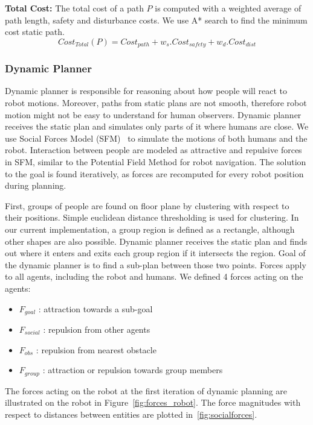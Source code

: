 \documentclass[12pt]{gatech-thesis}
\begin{document}
\textbf{Total Cost:} The total cost of a path $P$ is computed with a weighted average of path length, safety and disturbance costs. We use A* search to find the minimum cost static path.
\[
Cost_{Total}(P) = Cost_{path}+w_{s}.Cost_{safety} + w_d.Cost_{dist}
\]

\subsubsection{Dynamic Planner}
Dynamic planner is responsible for reasoning about how people will react to robot motions. Moreover, paths from static plans are not smooth, therefore robot motion might not be easy to understand for human observers. Dynamic planner receives the static plan and simulates only parts of it where humans are close. We use Social Forces Model (SFM)~\cite{helbing1995social} to simulate the motions of both humans and the robot. Interaction between people are modeled as attractive and repulsive forces in SFM, similar to the Potential Field Method for robot navigation. The solution to the goal is found iteratively, as forces are recomputed for every robot position during planning.

First, groups of people are found on floor plane by clustering with respect to their positions. Simple euclidean distance thresholding is used for clustering. In our current implementation, a group region is defined as a rectangle, although other shapes are also possible. Dynamic planner receives the static plan and finds out where it enters and exits each group region if it intersects the region. Goal of the dynamic planner is to find a sub-plan between those two points. Forces apply to all agents, including the robot and humans. We defined 4 forces acting on the agents:

\begin{itemize}
  \item $F_{goal}$ : attraction towards a sub-goal
  \item $F_{social}$ : repulsion from other agents
  \item $F_{obs}$ : repulsion from nearest obstacle
  \item $F_{group}$ : attraction or repulsion towards group members
\end{itemize}

The forces acting on the robot at the first iteration of dynamic planning are illustrated on the robot in Figure~\ref{fig:forces_robot}. The force magnitudes with respect to distances between entities are plotted in~\ref{fig:socialforces}. 
\end{document}
